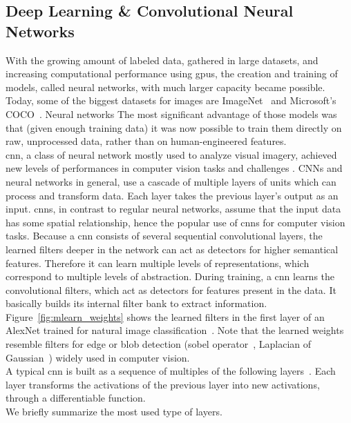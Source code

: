 \subsection{Deep Learning \& Convolutional Neural Networks}
With the growing amount of labeled data, gathered in large datasets, and increasing computational performance using \gls{gpu}s, the creation and training of models, called neural networks, with much larger capacity became possible. Today, some of the biggest datasets for images are ImageNet~\cite{Russakovsky2015ImageNetChallenge} and Microsoft's COCO~\cite{Lin2014MicrosoftContext}.
Neural networks
The most significant advantage of those models was that (given enough training data) it was now possible to train them directly on raw, unprocessed data, rather than on human-engineered features.\\
\gls{cnn}, a class of neural network mostly used to analyze visual imagery, achieved new levels of performances in computer vision tasks and challenges \cite{Krizhevsky2012ImageNetNetworks,Simonyan2014VeryRecognition,Szegedy2014GoingConvolutions,He2015DeepRecognition,Zeiler2014VisualizingNetworks}. 
CNNs and neural networks in general, use a cascade of multiple layers of units which can process and transform data. Each layer takes the previous layer's output as an input. \gls{cnn}s, in contrast to regular neural networks, assume that the input data has some spatial relationship, hence the popular use of \gls{cnn}s for computer vision tasks. Because a \gls{cnn} consists of several sequential convolutional layers, the learned filters deeper in the network can act as detectors for higher semantical features. Therefore it can learn multiple levels of representations, which correspond to multiple levels of abstraction. During training, a \gls{cnn} learns the convolutional filters, which act as detectors for features present in the data. It basically builds its internal filter bank to extract information. Figure~\ref{fig:mlearn_weights} shows the learned filters in the first layer of an AlexNet trained for natural image classification~\cite{Russakovsky2015ImageNetChallenge}. Note that the learned weights resemble filters for edge or blob detection (sobel operator~\cite{Sobel1990AnOperator}, Laplacian of Gaussian~\cite{Marr187}) widely used in computer vision.\\
A typical \gls{cnn} is built as a sequence of multiples of the following layers~\cite{KarpathyStanfordRecognition}. Each layer transforms the activations of the previous layer into new activations, through a differentiable function.\\
We briefly summarize the most used type of layers.

